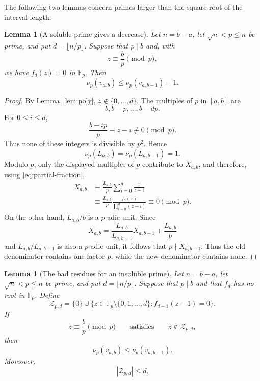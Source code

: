 \documentclass[11pt]{article}
\newtheorem{lemma}[theorem]{Lemma}
\newcommand{\F}{\mathbb F}
\begin{document}
The following two lemmas concern primes larger than the square root of the interval length.

\begin{lemma}[A soluble prime gives a decrease]\label{lem:S-local}
Let $n=b-a$, let $\sqrt n<p\leq n$ be prime, and put $d=\lfloor n/p\rfloor$. Suppose that $p\mid b$ and, with
\[
  z\equiv \frac bp\pmod p,
\]
we have $f_d(z)=0$ in $\F_p$. Then
\[
  \nu_p(v_{a,b})\leq \nu_p(v_{a,b-1})-1.
\]
\end{lemma}

\begin{proof}
By Lemma~\ref{lem:poly}, $z\notin\{0,\ldots,d\}$. The multiples of $p$ in $[a,b]$ are
\[
  b,b-p,\ldots,b-dp.
\]
For $0\leq i\leq d$,
\[
  \frac{b-ip}{p}\equiv z-i\not\equiv0\pmod p.
\]
Thus none of these integers is divisible by $p^2$. Hence
\[
  \nu_p(L_{a,b})=\nu_p(L_{a,b-1})=1.
\]
Modulo $p$, only the displayed multiples of $p$ contribute to $X_{a,b}$, and therefore, using \eqref{eq:partial-fraction},
\[
\begin{aligned}
  X_{a,b}
  &\equiv \frac{L_{a,b}}p\sum_{i=0}^{d}\frac1{z-i}\\
  &\equiv \frac{L_{a,b}}p
       \frac{f_d(z)}{\prod_{i=0}^{d}(z-i)}
   \equiv0\pmod p.
\end{aligned}
\]
On the other hand, $L_{a,b}/b$ is a $p$-adic unit. Since
\[
  X_{a,b}
  =\frac{L_{a,b}}{L_{a,b-1}}X_{a,b-1}+\frac{L_{a,b}}b
\]
and $L_{a,b}/L_{a,b-1}$ is also a $p$-adic unit, it follows that $p\nmid X_{a,b-1}$. Thus the old denominator contains one factor $p$, while the new denominator contains none.
\end{proof}

\begin{lemma}[The bad residues for an insoluble prime]\label{lem:T-local}
Let $n=b-a$, let $\sqrt n<p\leq n$ be prime, and put $d=\lfloor n/p\rfloor$. Suppose that $p\mid b$ and that $f_d$ has no root in $\F_p$. Define
\begin{equation}\label{eq:bad-z}
  \mathcal Z_{p,d}
  =\{0\}\cup
   \bigl\{z\in\F_p\setminus\{0,1,\ldots,d\}:
                 f_{d-1}(z-1)=0\bigr\}.
\end{equation}
If
\[
  z\equiv \frac bp\pmod p
  \qquad\text{satisfies}\qquad
  z\notin\mathcal Z_{p,d},
\]
then
\[
  \nu_p(v_{a,b})\leq \nu_p(v_{a,b-1}).
\]
Moreover,
\begin{equation}\label{eq:bad-cardinality}
  |\mathcal Z_{p,d}|\leq d.
\end{equation}
\end{lemma}
\end{document}
